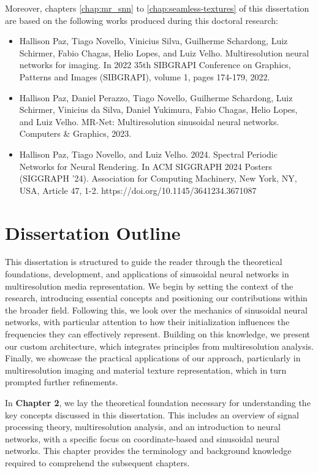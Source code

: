 Moreover, chapters \ref{chap:mr_snn} to \ref{chap:seamless-textures} of this dissertation are based on the following works produced during this doctoral research:

\begin{itemize}
    \item Hallison Paz, Tiago Novello, Vinicius Silva, Guilherme Schardong, Luiz Schirmer, Fabio Chagas, Helio Lopes, and Luiz Velho. Multiresolution neural networks for imaging. In 2022 35th SIBGRAPI Conference on Graphics, Patterns and Images (SIBGRAPI), volume 1, pages 174-179, 2022.
    \item Hallison Paz, Daniel Perazzo, Tiago Novello, Guilherme Schardong, Luiz Schirmer, Vinicius da Silva, Daniel Yukimura, Fabio Chagas, Helio Lopes, and Luiz Velho. MR-Net: Multiresolution sinusoidal neural networks. Computers \& Graphics, 2023.
    \item Hallison Paz, Tiago Novello, and Luiz Velho. 2024. Spectral Periodic Networks for Neural Rendering. In ACM SIGGRAPH 2024 Posters (SIGGRAPH '24). Association for Computing Machinery, New York, NY, USA, Article 47, 1-2. https://doi.org/10.1145/3641234.3671087
\end{itemize}


\section{Dissertation Outline}

This dissertation is structured to guide the reader through the theoretical foundations, development, and applications of sinusoidal neural networks in multiresolution media representation. We begin by setting the context of the research, introducing essential concepts and positioning our contributions within the broader field. Following this, we look over the mechanics of sinusoidal neural networks, with particular attention to how their initialization influences the frequencies they can effectively represent. Building on this knowledge, we present our custom architecture, which integrates principles from multiresolution analysis. Finally, we showcase the practical applications of our approach, particularly in multiresolution imaging and material texture representation, which in turn prompted further refinements.

In \textbf{Chapter 2}, we lay the theoretical foundation necessary for understanding the key concepts discussed in this dissertation. This includes an overview of signal processing theory, multiresolution analysis, and an introduction to neural networks, with a specific focus on coordinate-based and sinusoidal neural networks. This chapter provides the terminology and background knowledge required to comprehend the subsequent chapters.

